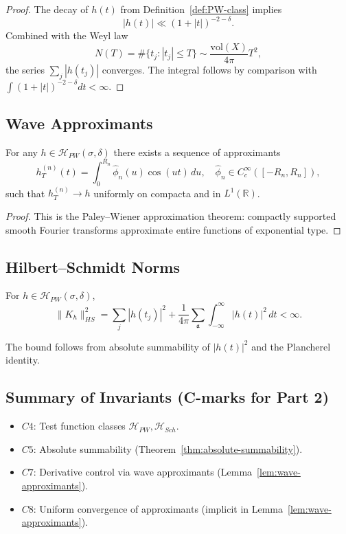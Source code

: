 \begin{proof}
The decay of $h(t)$ from Definition~\ref{def:PW-class} implies 
\[
|h(t)| \ll (1+|t|)^{-2-\delta}.
\]
Combined with the Weyl law
\[
N(T) = \#\{t_j: |t_j| \leq T\} \sim \frac{\mathrm{vol}(X)}{4\pi} T^2,
\]
the series $\sum_j |h(t_j)|$ converges. The integral follows by comparison with $\int (1+|t|)^{-2-\delta} dt < \infty$.
\end{proof}

\subsection{Wave Approximants}

\begin{lemma}
\label{lem:wave-approximants}
For any $h \in \mathcal{H}_{PW}(\sigma,\delta)$ there exists a sequence of approximants
\[
h_T^{(n)}(t) = \int_0^{R_n} \widehat{\phi}_n(u)\cos(ut)\,du, 
\quad \widehat{\phi}_n \in C_c^\infty([-R_n,R_n]),
\]
such that $h_T^{(n)} \to h$ uniformly on compacta and in $L^1(\mathbb{R})$.
\end{lemma}

\begin{proof}
This is the Paley–Wiener approximation theorem: compactly supported smooth Fourier transforms approximate entire functions of exponential type.
\end{proof}

\subsection{Hilbert–Schmidt Norms}

\begin{proposition}
\label{prop:HS-bound}
For $h \in \mathcal{H}_{PW}(\sigma,\delta)$,
\[
\|K_h\|_{HS}^2 = \sum_j |h(t_j)|^2 + \frac{1}{4\pi} \sum_{\mathfrak{a}} \int_{-\infty}^{\infty} |h(t)|^2 \, dt < \infty.
\]
\end{proposition}

\begin{remark}
The bound follows from absolute summability of $|h(t)|^2$ and the Plancherel identity.
\end{remark}

\subsection*{Summary of Invariants (C-marks for Part 2)}

\begin{itemize}
  \item $C4$: Test function classes $\mathcal{H}_{PW}, \mathcal{H}_{Sch}$.
  \item $C5$: Absolute summability (Theorem~\ref{thm:absolute-summability}).
  \item $C7$: Derivative control via wave approximants (Lemma~\ref{lem:wave-approximants}).
  \item $C8$: Uniform convergence of approximants (implicit in Lemma~\ref{lem:wave-approximants}).
\end{itemize}

